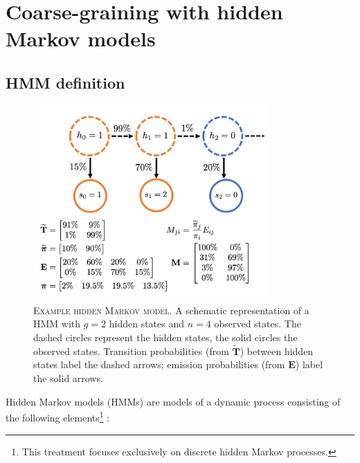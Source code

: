 \section{Coarse-graining with hidden Markov models}\label{sec:theory_hmm}
\subsection{HMM definition}
\begin{figure}
    \centering
    \includegraphics[width=0.8\textwidth]{chapters/theory/figures/hmm.png}
    \caption[Example hidden Markov model]{\textsc{Example hidden Markov model}. A schematic representation of a HMM with $g=2$ hidden states and $n=4$ observed states. The dashed circles represent the hidden states, the solid circles the observed states. Transition probabilities (from $\widetilde{\mathbf{T}}$) between hidden states label the dashed arrows; emission probabilities (from $\mathbf{E}$) label the solid arrows. }
    \label{fig:theory_hmm}
\end{figure}
Hidden Markov models (HMMs) are models of a dynamic process consisting of the following elements\footnote{This treatment focuses exclusively on discrete hidden Markov processes.} \cite{rabinerTutorialHiddenMarkov1989}:
